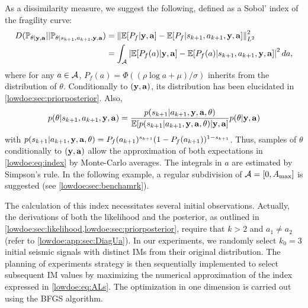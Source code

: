 As a dissimilarity measure, we suggest the following, defined as a  Sobol' index of the fragility curve:
    \begin{align}
    \nonumber
        D(\mathbb{P}_{\theta|\mathbf{y},\mathbf{a}} || \mathbb{P}_{\theta|s_{k+1},a_{k+1},\mathbf{y},\mathbf{a}} ) &= \left\|\mathbb{E}[P_f|\mathbf{y},\mathbf{a}]-\mathbb{E}[P_f|s_{k+1}, a_{k+1}, \mathbf{y},\mathbf{a}]\right\|_{L^2}^2\\
        &= \int_{\mathcal{A}}\left|\mathbb{E}[P_f(a)|\mathbf{y},\mathbf{a}]-\mathbb{E}[P_f(a)|s_{k+1}, a_{k+1}, \mathbf{y},\mathbf{a}]\right|^2d a ,\label{lowdoe:eq:index}
    \end{align}
where for any $a\in\mathcal{A}$, $P_f(a)=\Phi\left((\rho\log a+\mu)/\sigma\right)$ inherits from the distribution of $\theta$. {Conditionally to $(\mathbf{y},\mathbf{a})$, its distribution has been elucidated in \cref{lowdoe:sec:priorposterior}. %
Also, 
\begin{equation}
    p(\theta|s_{k+1}, a_{k+1},\mbf y,\mbf a)  =  \frac{p(s_{k+1}|a_{k+1},\mbf y,\mbf a,\theta)}{\EE[ p(s_{k+1}|a_{k+1},\mbf y,\mbf a,\theta)|\mbf y,\mbf a]}%
        p(\theta|\mbf y,\mbf a)
\end{equation}
with $p(s_{k+1}|a_{k+1},\mathbf{y},\mathbf{a},\theta)=P_f(a_{k+1})^{s_{k+1}}(1-P_f(a_{k+1}))^{1-s_{k+1}}$. Thus, samples of $\theta$ conditionally to $(\mathbf{y},\mathbf{a})$ allow the approximation of both expectations in \cref{lowdoe:eq:index} by Monte-Carlo averages. The integrals in $a$ are estimated by Simpson's rule.
In the following example, a regular subdivision of $\mathcal{A}=[0,A_{\rm max}]$ is suggested (see \cref{lowdoe:sec:benchamrk}).
}


{
The calculation of this index necessitates several initial observations. Actually, the derivations of both the likelihood and the posterior, as outlined in \cref{lowdoe:sec:likelihood,lowdoe:sec:priorposterior}, require that $k > 2$ and $a_1 \ne a_2$ (refer to \cref{lowdoe:app:sec:DiagUa}). In our experiments, we randomly select $k_0 = 3$ initial seismic signals with distinct IMs from their original distribution. The planning of experiments strategy is then sequentially implemented to select subsequent IM values by maximizing the numerical approximation of the index expressed in \cref{lowdoe:eq:ALs}. The optimization in one dimension is carried out using the BFGS algorithm.
}





